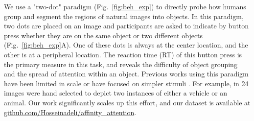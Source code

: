 \documentclass{article}
\begin{document}
We use a "two-dot" paradigm (Fig.~\ref{fig:beh_exp}) to directly probe how humans group and segment the regions of natural images into objects. In this paradigm, two dots are placed on an image and participants are asked to indicate by button press whether they are on the same object or two different objects (Fig.~\ref{fig:beh_exp}A). One of these dots is always at the center location, and the other is at a peripheral location. The reaction time (RT) of this button press is the primary measure in this task, and reveals the difficulty of object grouping and the spread of attention within an object. Previous works using this paradigm have been limited in scale or have focused on simpler stimuli \citep{vecera2000toward, kim2019disentangling, korjoukov2012time}. For example, in \cite{korjoukov2012time} 24 images were hand selected to depict two instances of either a vehicle or an animal. Our work significantly scales up this effort, and our dataset is available at \href{https://github.com/Hosseinadeli/affinity_attention}{github.com/Hosseinadeli/affinity\_attention}.

\end{document}
